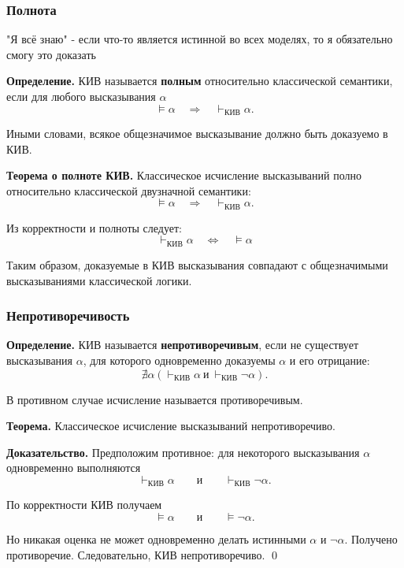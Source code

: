 \documentclass[12pt,a4paper,oneside,openany]{book}
\theoremstyle{definition}
\theoremstyle{plain}
\theoremstyle{remark}
\begin{document}
\subsubsection{Полнота}
\vspace{7mm}
"Я всё знаю" - если что-то является истинной во всех моделях, то я обязательно смогу это доказать
\vspace{7mm}


\textbf{Определение.}
КИВ называется \textbf{полным} относительно классической семантики,
если для любого высказывания \(\alpha\)
\[
\models\alpha
\quad\Longrightarrow\quad
\vdash_{\mathrm{КИВ}}\alpha.
\]

Иными словами, всякое общезначимое высказывание должно быть доказуемо
в КИВ.

\textbf{Теорема о полноте КИВ.}
Классическое исчисление высказываний полно относительно классической
двузначной семантики:
\[
\models\alpha
\quad\Longrightarrow\quad
\vdash_{\mathrm{КИВ}}\alpha.
\]

Из корректности и полноты следует:
\[
\boxed{
\vdash_{\mathrm{КИВ}}\alpha
\quad\Longleftrightarrow\quad
\models\alpha
}
\]

Таким образом, доказуемые в КИВ высказывания совпадают с общезначимыми
высказываниями классической логики.

\subsubsection{Непротиворечивость}

\textbf{Определение.}
КИВ называется \textbf{непротиворечивым}, если не существует
высказывания \(\alpha\), для которого одновременно доказуемы
\(\alpha\) и его отрицание:
\[
\nexists\alpha
\left(
\vdash_{\mathrm{КИВ}}\alpha
\ \text{и}\
\vdash_{\mathrm{КИВ}}\neg\alpha
\right).
\]

В противном случае исчисление называется противоречивым.

\textbf{Теорема.}
Классическое исчисление высказываний непротиворечиво.

\textbf{Доказательство.}
Предположим противное: для некоторого высказывания \(\alpha\)
одновременно выполняются
\[
\vdash_{\mathrm{КИВ}}\alpha
\qquad\text{и}\qquad
\vdash_{\mathrm{КИВ}}\neg\alpha.
\]

По корректности КИВ получаем
\[
\models\alpha
\qquad\text{и}\qquad
\models\neg\alpha.
\]

Но никакая оценка не может одновременно делать истинными
\(\alpha\) и \(\neg\alpha\). Получено противоречие. Следовательно,
КИВ непротиворечиво.
\qed
\end{document}
